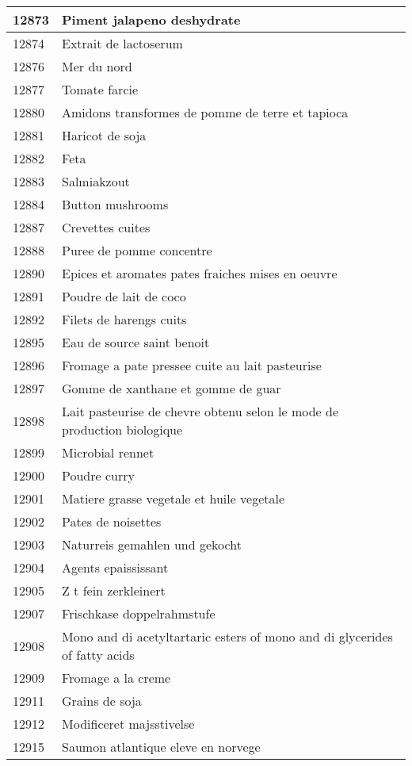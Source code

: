 \begin{longtable}{|l|l|}
12873 & Piment jalapeno deshydrate \\ \hline 
12874 & Extrait de lactoserum \\ \hline 
12876 & Mer du nord \\ \hline 
12877 & Tomate farcie \\ \hline 
12880 & Amidons transformes de pomme de terre et tapioca \\ \hline 
12881 & Haricot de soja \\ \hline 
12882 & Feta \\ \hline 
12883 & Salmiakzout \\ \hline 
12884 & Button mushrooms \\ \hline 
12887 & Crevettes cuites \\ \hline 
12888 & Puree de pomme concentre \\ \hline 
12890 & Epices et aromates pates fraiches mises en oeuvre \\ \hline 
12891 & Poudre de lait de coco \\ \hline 
12892 & Filets de harengs cuits \\ \hline 
12895 & Eau de source saint benoit \\ \hline 
12896 & Fromage a pate pressee cuite au lait pasteurise \\ \hline 
12897 & Gomme de xanthane et gomme de guar \\ \hline 
12898 & Lait pasteurise de chevre obtenu selon le mode de production biologique \\ \hline 
12899 & Microbial rennet \\ \hline 
12900 & Poudre curry \\ \hline 
12901 & Matiere grasse vegetale et huile vegetale \\ \hline 
12902 & Pates de noisettes \\ \hline 
12903 & Naturreis gemahlen und gekocht \\ \hline 
12904 & Agents epaississant \\ \hline 
12905 & Z t fein zerkleinert \\ \hline 
12907 & Frischkase doppelrahmstufe \\ \hline 
12908 & Mono and di acetyltartaric esters of mono and di glycerides of fatty acids \\ \hline 
12909 & Fromage a la creme \\ \hline 
12911 & Grains de soja \\ \hline 
12912 & Modificeret majsstivelse \\ \hline 
12915 & Saumon atlantique eleve en norvege \\ \hline 

\end{longtable}
